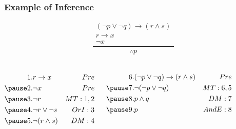 \documentclass[dvipsnames]{beamer}
\begin{document}
\begin{frame}
  \frametitle{Example of Inference}

  \begin{example}
    \[
    \frac
      {
        \begin{array}{c}
          (\neg p \vee \neg q) \rightarrow (r \wedge s)\\
          r \rightarrow x\\
          \neg x
        \end{array}
      }
      {
        \therefore p
      }
    \]

    \pause
    \begin{columns}[t]
      \begin{eqnarray*}
        1. & r \rightarrow x                               & Pre\\
        \pause
        2. & \neg x                                        & Pre\\
        \pause
        3. & \neg r                                        & MT:1,2\\
        \pause
        4. & \neg r \vee \neg s                            & OrI:3\\
        \pause
        5. & \neg (r \wedge s)                             & DM:4
      \end{eqnarray*}

      \pause
      \begin{eqnarray*}
        6. & (\neg p \vee \neg q) \rightarrow (r \wedge s) & Pre\\
        \pause
        7. & \neg (\neg p \vee \neg q)                     & MT:6,5\\
        \pause
        8. & p \wedge q                                    & DM:7\\
        \pause
        9. & p                                             & AndE:8
      \end{eqnarray*}
    \end{columns}
  \end{example}
\end{frame}
\end{document}
